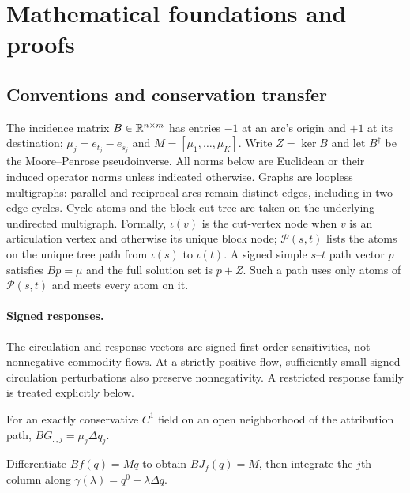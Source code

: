 \section{Mathematical foundations and proofs}\label{app:proofs}

\subsection{Conventions and conservation transfer}\label{app:notation}
The incidence matrix $B\in\mathbb{R}^{n\times m}$ has entries $-1$ at an arc's
origin and $+1$ at its destination; $\mu_j=e_{t_j}-e_{s_j}$ and
$M=[\mu_1,\ldots,\mu_K]$. Write $Z=\ker B$ and let $B^\dagger$ be the
Moore--Penrose pseudoinverse. All norms below are Euclidean or their
induced operator norms unless indicated otherwise. Graphs are loopless
multigraphs: parallel and reciprocal arcs remain distinct edges, including
in two-edge cycles. Cycle atoms and the block-cut tree are taken on the
underlying undirected multigraph. Formally, $\iota(v)$ is the cut-vertex
node when $v$ is an articulation vertex and otherwise its unique block
node; $\mathcal P(s,t)$ lists the atoms on the unique tree path from
$\iota(s)$ to $\iota(t)$. A signed simple $s$--$t$ path vector $p$ satisfies
$Bp=\mu$ and the full solution set is $p+Z$. Such a path uses only atoms
of $\mathcal P(s,t)$ and meets every atom on it.

\paragraph{Signed responses.}\label{app:signed}
The circulation and response vectors are signed first-order sensitivities,
not nonnegative commodity flows. At a strictly positive flow, sufficiently
small signed circulation perturbations also preserve nonnegativity. A
restricted response family is treated explicitly below.

\begin{corollary}[IG exchange]\label{cor:ig}
For an exactly conservative $C^1$ field on an open neighborhood of the
attribution path, $BG_{:,j}=\mu_j\Delta q_j$.
\end{corollary}
\begin{pf}
Differentiate $Bf(q)=Mq$ to obtain $BJ_f(q)=M$, then integrate the
$j$th column along $\gamma(\lambda)=q^0+\lambda\Delta q$.
\end{pf}

